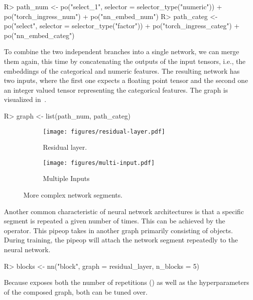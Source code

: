 \documentclass[article]{jss}
\theoremstyle{definition}
\begin{document}
\begin{CodeInput}
R> path_num <- po("select_1", selector = selector_type("numeric")) %
+    po("torch_ingress_num") %
+    po("nn_embed_num")
R> path_categ <- po("select", selector = selector_type("factor")) %
+    po("torch_ingress_categ") %
+    po("nn_embed_categ")
\end{CodeInput}

To combine the two independent branches into a single network, we can merge them again, this time by concatenating the outputs of the input tensors, i.e., the embeddings of the categorical and numeric features.
The resulting network has two inputs, where the first one expects a floating point tensor and the second one an integer valued tensor representing the categorical features.
The graph is visualized in~.

\begin{CodeInput}
R> graph <- list(path_num, path_categ) %
\end{CodeInput}

\begin{figure}[h]
    \centering
    \begin{subfigure}{0.38\textwidth}
        \centering
        \texttt{[image: figures/residual-layer.pdf]}
        \caption{Residual layer.}
        \label{fig:residual-layer}
    \end{subfigure}
    \hfill
    \begin{subfigure}{0.58\textwidth}
        \centering
        \texttt{[image: figures/multi-input.pdf]}
        \caption{Multiple Inputs}
        \label{fig:multi-inputs}
    \end{subfigure}
    \caption{More complex network segments.}
    \label{fig:side-by-side}
\end{figure}

Another common characteristic of neural network architectures is that a specific segment is repeated a given number of times.
This can be achieved by the  operator.
This pipeop takes in another graph primarily consisting of  objects.
During training, the pipeop will attach the network segment repeatedly to the neural network.

\begin{CodeInput}
R> blocks <- nn("block", graph = residual_layer, n_blocks = 5)
\end{CodeInput}

Because  exposes both the number of repetitions () as well as the hyperparameters of the composed graph, both can be tuned over.
\end{document}
